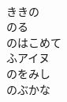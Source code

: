 \documentclass[10pt,b5j]{tarticle} %
\begin{document}
\begin{enumerate}
\begin{minipage}[c]{\blocksize}
        \vspace{\linespace}
        \item~\\
        ききの\\
        のる\\
        のはこめて\\
        ふアイヌ\\
        のをみし\\
        のぶかな
    
    \end{minipage}
\end{enumerate} %
\end{document}
